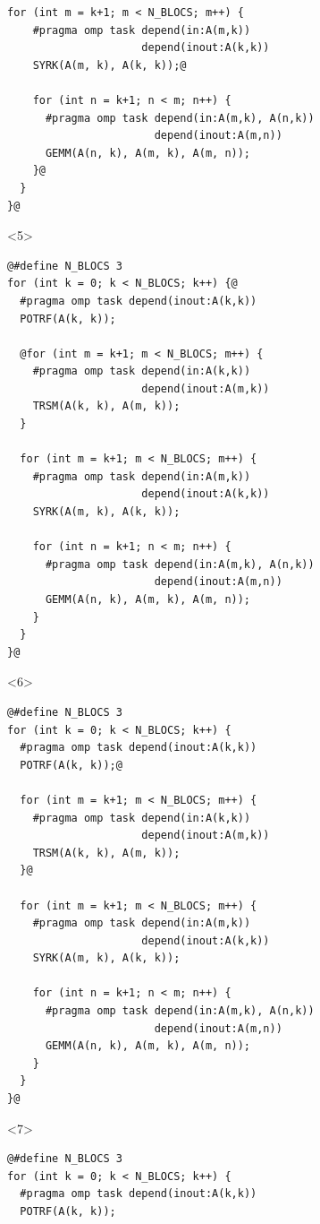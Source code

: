 \documentclass[xcolor={usenames,dvipsnames,svgnames,table}, aspectratio=43]{beamer}
\begin{document}
\begin{frame}[fragile]
\begin{minipage}[t]{0.52\linewidth}
\begin{onlyenv}
\begin{lstlisting}[style=transparency]
  for (int m = k+1; m < N_BLOCS; m++) {
    #pragma omp task depend(in:A(m,k))
                     depend(inout:A(k,k))
    SYRK(A(m, k), A(k, k));@

    for (int n = k+1; n < m; n++) {
      #pragma omp task depend(in:A(m,k), A(n,k))
                       depend(inout:A(m,n))
      GEMM(A(n, k), A(m, k), A(m, n));
    }@
  }
}@
  \end{lstlisting}
\end{onlyenv}
  \begin{onlyenv}<5>
  \begin{lstlisting}[style=transparency]
@#define N_BLOCS 3
for (int k = 0; k < N_BLOCS; k++) {@
  #pragma omp task depend(inout:A(k,k))
  POTRF(A(k, k));

  @for (int m = k+1; m < N_BLOCS; m++) {
    #pragma omp task depend(in:A(k,k))
                     depend(inout:A(m,k))
    TRSM(A(k, k), A(m, k));
  }

  for (int m = k+1; m < N_BLOCS; m++) {
    #pragma omp task depend(in:A(m,k))
                     depend(inout:A(k,k))
    SYRK(A(m, k), A(k, k));

    for (int n = k+1; n < m; n++) {
      #pragma omp task depend(in:A(m,k), A(n,k))
                       depend(inout:A(m,n))
      GEMM(A(n, k), A(m, k), A(m, n));
    }
  }
}@
  \end{lstlisting}
\end{onlyenv}
  \begin{onlyenv}<6>
  \begin{lstlisting}[style=transparency]
@#define N_BLOCS 3
for (int k = 0; k < N_BLOCS; k++) {
  #pragma omp task depend(inout:A(k,k))
  POTRF(A(k, k));@

  for (int m = k+1; m < N_BLOCS; m++) {
    #pragma omp task depend(in:A(k,k))
                     depend(inout:A(m,k))
    TRSM(A(k, k), A(m, k));
  }@

  for (int m = k+1; m < N_BLOCS; m++) {
    #pragma omp task depend(in:A(m,k))
                     depend(inout:A(k,k))
    SYRK(A(m, k), A(k, k));

    for (int n = k+1; n < m; n++) {
      #pragma omp task depend(in:A(m,k), A(n,k))
                       depend(inout:A(m,n))
      GEMM(A(n, k), A(m, k), A(m, n));
    }
  }
}@
  \end{lstlisting}
\end{onlyenv}
  \begin{onlyenv}<7>
  \begin{lstlisting}[style=transparency]
@#define N_BLOCS 3
for (int k = 0; k < N_BLOCS; k++) {
  #pragma omp task depend(inout:A(k,k))
  POTRF(A(k, k));


\end{lstlisting}
\end{onlyenv}
\end{minipage}
\end{frame}
\end{document}
